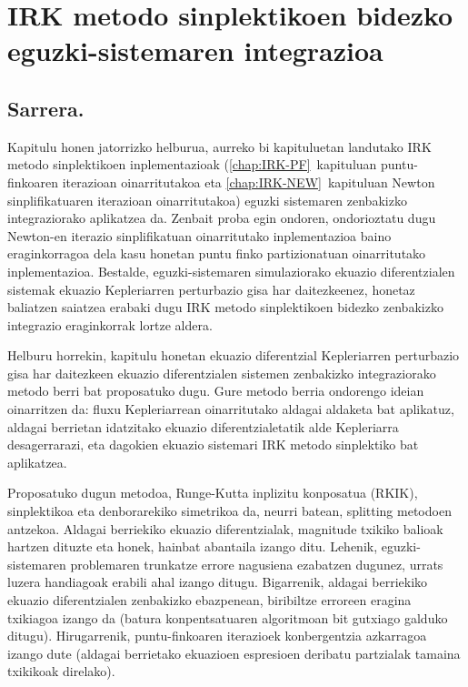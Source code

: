 \chapter{IRK metodo sinplektikoen bidezko eguzki-sistemaren  integrazioa}


\section{Sarrera.}

Kapitulu honen jatorrizko helburua, aurreko  bi kapituluetan landutako IRK metodo sinplektikoen inplementazioak (\ref{chap:IRK-PF}~kapituluan puntu-finkoaren iterazioan oinarritutakoa eta \ref{chap:IRK-NEW}~kapituluan Newton sinplifikatuaren iterazioan oinarritutakoa) eguzki sistemaren zenbakizko integraziorako aplikatzea da.  Zenbait proba egin ondoren, ondorioztatu dugu Newton-en iterazio sinplifikatuan oinarritutako inplementazioa baino eraginkorragoa dela kasu  honetan puntu finko partizionatuan oinarritutako inplementazioa. Bestalde, eguzki-sistemaren simulaziorako ekuazio diferentzialen sistemak ekuazio Kepleriarren perturbazio gisa har daitezkeenez, honetaz baliatzen saiatzea erabaki dugu IRK metodo sinplektikoen bidezko zenbakizko integrazio eraginkorrak lortze aldera.

Helburu horrekin,  kapitulu honetan ekuazio diferentzial Kepleriarren perturbazio gisa har daitezkeen ekuazio diferentzialen sistemen zenbakizko integraziorako metodo berri bat proposatuko dugu. Gure metodo berria ondorengo ideian  oinarritzen da: fluxu Kepleriarrean oinarritutako aldagai aldaketa bat aplikatuz, aldagai berrietan idatzitako ekuazio diferentzialetatik alde Kepleriarra desagerrarazi, eta dagokien ekuazio sistemari IRK metodo sinplektiko bat aplikatzea.



Proposatuko dugun metodoa, Runge-Kutta inplizitu konposatua (RKIK),  sinplektikoa eta denborarekiko simetrikoa da, neurri batean, splitting metodoen antzekoa. Aldagai berriekiko ekuazio diferentzialak, magnitude txikiko balioak hartzen dituzte eta honek, hainbat abantaila izango ditu. Lehenik, eguzki-sistemaren problemaren trunkatze errore nagusiena ezabatzen dugunez, urrats luzera handiagoak erabili ahal izango ditugu. Bigarrenik, aldagai berriekiko ekuazio diferentzialen zenbakizko ebazpenean, biribiltze erroreen eragina txikiagoa izango da (batura konpentsatuaren algoritmoan bit gutxiago galduko ditugu). Hirugarrenik, puntu-finkoaren iterazioek konbergentzia azkarragoa izango dute (aldagai berrietako ekuazioen espresioen deribatu partzialak tamaina txikikoak direlako).


